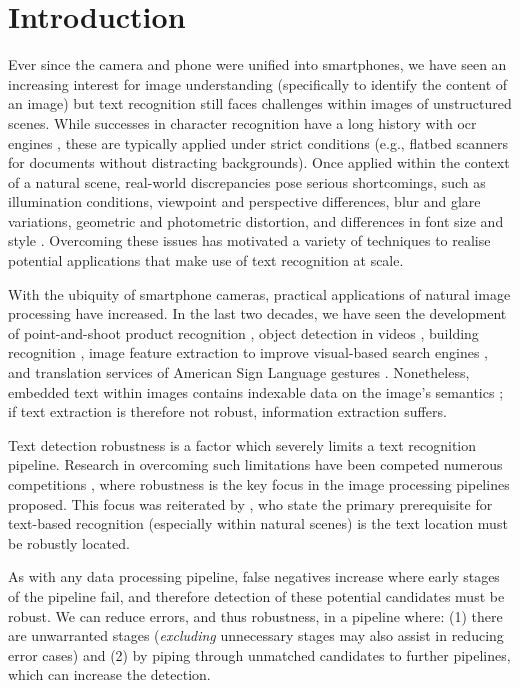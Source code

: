 \chapter{Introduction}
\label{ch:introduction}

Ever since the camera and phone were unified into smartphones, we have seen an increasing interest for image understanding (specifically to identify the content of an image) but text recognition still faces challenges within images of unstructured scenes. While successes in character recognition have a long history with \gls{ocr} engines \citep{Smith:1987tg}, these are typically applied under strict conditions (e.g., flatbed scanners for documents without distracting backgrounds). Once applied within the context of a natural scene, real-world discrepancies pose serious shortcomings, such as illumination conditions, viewpoint and perspective differences, blur and glare variations, geometric and photometric distortion, and differences in font size and style \citep{Zhang:2008vfa, Jung:2004uw}. Overcoming these issues has motivated a variety of techniques to realise potential applications that make use of text recognition at scale.

With the ubiquity of smartphone cameras, practical applications of natural image processing have increased. In the last two decades, we have seen the development of point-and-shoot product recognition \citep{Tsai:2010cn,Girod:2011gw}, object detection in videos \citep{Sivic:2003tj}, building recognition \citep{Takacs:2008cg}, image feature extraction to improve visual-based search engines \citep{Lowe:2004kp,Bay:2008ud}, and translation services of American Sign Language gestures \citep{Jin:2016jd}. Nonetheless, embedded text within images contains indexable data on the image's semantics \citep{Smeulders:2000tx}; if text extraction is therefore not robust, information extraction suffers.

Text detection robustness is a factor which severely limits a text recognition pipeline. Research in overcoming such limitations have been competed numerous competitions \citep{Lucas:2003iw, Lucas:2005bq, Shahab:2011hq, Hua:2004vf}, where robustness is the key focus in the image processing pipelines proposed. This focus was reiterated by \citet{Chen:2011ul}, who state the primary prerequisite for text-based recognition (especially within natural scenes) is the text location must be robustly located.

As with any data processing pipeline, false negatives increase where early stages of the pipeline fail, and therefore detection of these potential candidates must be robust. We can reduce errors, and thus robustness, in a pipeline where: (1) there are unwarranted stages (\textit{excluding} unnecessary stages may also assist in reducing error cases) and (2) by piping through unmatched candidates to further pipelines, which can increase the detection.

